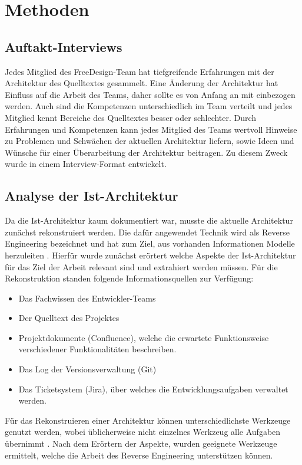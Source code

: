 \chapter{Methoden}

\section{Auftakt-Interviews}
Jedes Mitglied des FreeDesign-Team hat tiefgreifende Erfahrungen mit der Architektur des Quelltextes gesammelt. Eine Änderung der Architektur hat Einfluss auf die Arbeit des Teams, daher sollte es von Anfang an mit einbezogen werden. Auch sind die Kompetenzen unterschiedlich im Team verteilt und jedes Mitglied kennt Bereiche des Quelltextes besser oder schlechter. Durch Erfahrungen und Kompetenzen kann jedes Mitglied des Teams wertvoll Hinweise zu Problemen und Schwächen der aktuellen Architektur liefern, sowie Ideen und Wünsche für einer Überarbeitung der Architektur beitragen. 
Zu diesem Zweck wurde in einem Interview-Format entwickelt.

\section{Analyse der Ist-Architektur}
Da die Ist-Architektur kaum dokumentiert war, musste die aktuelle Architektur zunächst rekonstruiert werden. Die dafür angewendet Technik wird als Reverse Engineering bezeichnet und hat zum Ziel, aus vorhanden Informationen Modelle herzuleiten \autocite[vgl.][590]{LudewigLichter2013}.  Hierfür  wurde zunächst erörtert welche Aspekte der Ist-Architektur für das Ziel der Arbeit relevant sind und extrahiert werden müssen. 
Für die Rekonstruktion standen folgende Informationsquellen zur Verfügung:
\begin{itemize}
	\item Das Fachwissen des Entwickler-Teams
	\item Der Quelltext des Projektes
	\item Projektdokumente (Confluence), welche die erwartete Funktionsweise verschiedener Funktionalitäten beschreiben. 
	\item Das Log der Versionsverwaltung (Git)
	\item Das Ticketsystem (Jira), über welches die Entwicklungsaufgaben verwaltet werden. 
\end{itemize} 

Für das Rekonstruieren einer Architektur können unterschiedlichste Werkzeuge genutzt werden, wobei üblicherweise nicht einzelnes Werkzeug alle Aufgaben übernimmt \autocite[vgl.][381]{Bass2013}. 
Nach dem Erörtern der Aspekte, wurden geeignete Werkzeuge ermittelt, welche die Arbeit des Reverse Engineering unterstützen können.

